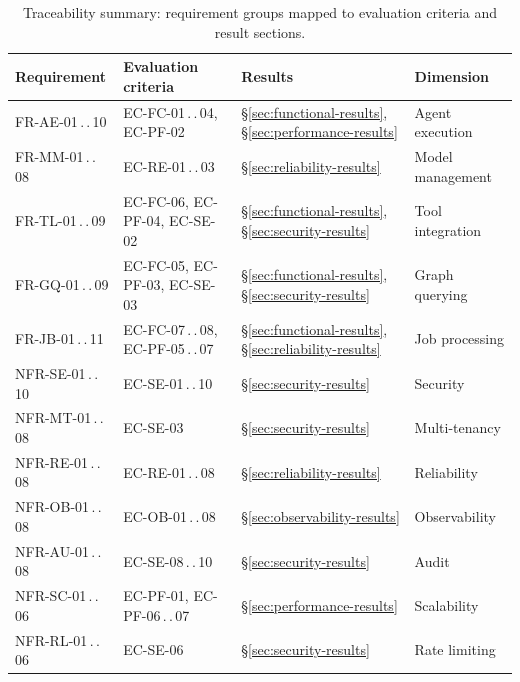 \documentclass[a4paper]{sapthesis}
\begin{document}
\begin{table}[ht]
\centering
\caption{Traceability summary: requirement groups mapped to evaluation
criteria and result sections.}
\label{tab:traceability}
\small
\begin{tabularx}{\textwidth}{@{}l l l X@{}}
    \hline
    \textbf{Requirement} & \textbf{Evaluation criteria} & \textbf{Results} &
        \textbf{Dimension} \\
    \hline
    FR-AE-01\,.\,.\,10 & EC-FC-01\,.\,.\,04, EC-PF-02 &
        \S\ref{sec:functional-results}, \S\ref{sec:performance-results} &
        Agent execution \\
    FR-MM-01\,.\,.\,08 & EC-RE-01\,.\,.\,03 &
        \S\ref{sec:reliability-results} &
        Model management \\
    FR-TL-01\,.\,.\,09 & EC-FC-06, EC-PF-04, EC-SE-02 &
        \S\ref{sec:functional-results}, \S\ref{sec:security-results} &
        Tool integration \\
    FR-GQ-01\,.\,.\,09 & EC-FC-05, EC-PF-03, EC-SE-03 &
        \S\ref{sec:functional-results}, \S\ref{sec:security-results} &
        Graph querying \\
    FR-JB-01\,.\,.\,11 & EC-FC-07\,.\,.\,08, EC-PF-05\,.\,.\,07 &
        \S\ref{sec:functional-results}, \S\ref{sec:reliability-results} &
        Job processing \\
    NFR-SE-01\,.\,.\,10 & EC-SE-01\,.\,.\,10 &
        \S\ref{sec:security-results} &
        Security \\
    NFR-MT-01\,.\,.\,08 & EC-SE-03 &
        \S\ref{sec:security-results} &
        Multi-tenancy \\
    NFR-RE-01\,.\,.\,08 & EC-RE-01\,.\,.\,08 &
        \S\ref{sec:reliability-results} &
        Reliability \\
    NFR-OB-01\,.\,.\,08 & EC-OB-01\,.\,.\,08 &
        \S\ref{sec:observability-results} &
        Observability \\
    NFR-AU-01\,.\,.\,08 & EC-SE-08\,.\,.\,10 &
        \S\ref{sec:security-results} &
        Audit \\
    NFR-SC-01\,.\,.\,06 & EC-PF-01, EC-PF-06\,.\,.\,07 &
        \S\ref{sec:performance-results} &
        Scalability \\
    NFR-RL-01\,.\,.\,06 & EC-SE-06 &
        \S\ref{sec:security-results} &
        Rate limiting \\
    \hline
\end{tabularx}
\end{table}
\end{document}
